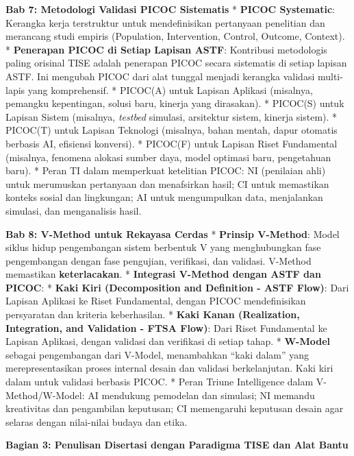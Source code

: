 \documentclass[
  letterpaper,
  DIV=11,
  numbers=noendperiod]{scrreprt}
\begin{document}
\textbf{Bab 7: Metodologi Validasi PICOC Sistematis} * \textbf{PICOC
Systematic}: Kerangka kerja terstruktur untuk mendefinisikan pertanyaan
penelitian dan merancang studi empiris (Population, Intervention,
Control, Outcome, Context). * \textbf{Penerapan PICOC di Setiap Lapisan
ASTF}: Kontribusi metodologis paling orisinal TISE adalah penerapan
PICOC secara sistematis di setiap lapisan ASTF. Ini mengubah PICOC dari
alat tunggal menjadi kerangka validasi multi-lapis yang komprehensif. *
PICOC(A) untuk Lapisan Aplikasi (misalnya, pemangku kepentingan, solusi
baru, kinerja yang dirasakan). * PICOC(S) untuk Lapisan Sistem
(misalnya, \emph{testbed} simulasi, arsitektur sistem, kinerja sistem).
* PICOC(T) untuk Lapisan Teknologi (misalnya, bahan mentah, dapur
otomatis berbasis AI, efisiensi konversi). * PICOC(F) untuk Lapisan
Riset Fundamental (misalnya, fenomena alokasi sumber daya, model
optimasi baru, pengetahuan baru). * Peran TI dalam memperkuat ketelitian
PICOC: NI (penilaian ahli) untuk merumuskan pertanyaan dan menafsirkan
hasil; CI untuk memastikan konteks sosial dan lingkungan; AI untuk
mengumpulkan data, menjalankan simulasi, dan menganalisis hasil.

\textbf{Bab 8: V-Method untuk Rekayasa Cerdas} * \textbf{Prinsip
V-Method}: Model siklus hidup pengembangan sistem berbentuk V yang
menghubungkan fase pengembangan dengan fase pengujian, verifikasi, dan
validasi. V-Method memastikan \textbf{keterlacakan}. * \textbf{Integrasi
V-Method dengan ASTF dan PICOC}: * \textbf{Kaki Kiri (Decomposition and
Definition - ASTF Flow)}: Dari Lapisan Aplikasi ke Riset Fundamental,
dengan PICOC mendefinisikan persyaratan dan kriteria keberhasilan. *
\textbf{Kaki Kanan (Realization, Integration, and Validation - FTSA
Flow)}: Dari Riset Fundamental ke Lapisan Aplikasi, dengan validasi dan
verifikasi di setiap tahap. * \textbf{W-Model} sebagai pengembangan dari
V-Model, menambahkan ``kaki dalam'' yang merepresentasikan proses
internal desain dan validasi berkelanjutan. Kaki kiri dalam untuk
validasi berbasis PICOC. * Peran Triune Intelligence dalam
V-Method/W-Model: AI mendukung pemodelan dan simulasi; NI memandu
kreativitas dan pengambilan keputusan; CI memengaruhi keputusan desain
agar selaras dengan nilai-nilai budaya dan etika.

\textbf{Bagian 3: Penulisan Disertasi dengan Paradigma TISE dan Alat
Bantu}
\end{document}
